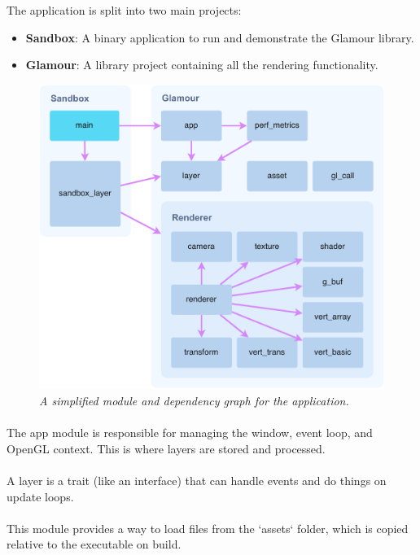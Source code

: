 \begin{multicols}{2}
  The application is split into two main projects:
  \begin{itemize}
    \item \textbf{Sandbox}: A binary application to run and demonstrate the Glamour library.
    \item \textbf{Glamour}: A library project containing all the rendering functionality.
  \end{itemize}

  \begin{figure}[H]
    \includegraphics[width=1\columnwidth]{../module-graph.pdf}
    \caption[Module graph]{\emph{A simplified module and dependency graph for the application.}}\label{fig:module-graph}
  \end{figure}

  \paragraph{}
  The app module is responsible for managing the window, event loop, and OpenGL context.
  This is where layers are stored and processed.

  \paragraph{}
  A layer is a trait (like an interface) that can handle events and do things on update loops.

  \paragraph{}
  This module provides a way to load files from the `assets` folder, which is copied relative to the executable on build.


\end{multicols}
